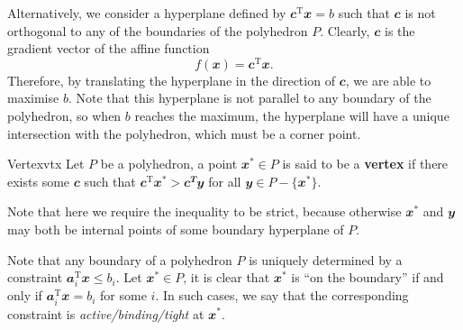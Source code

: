 \documentclass[math, code]{amznotes}
\theoremstyle{remark}
\begin{document}
Alternatively, we consider a hyperplane defined by $\mathbfit{c}^{\mathrm{T}}\mathbfit{x} = b$ such that $\mathbfit{c}$ is not orthogonal to any of the boundaries of the polyhedron $P$. Clearly, $\mathbfit{c}$ is the gradient vector of the affine function
\begin{equation*}
    f(\mathbfit{x}) = \mathbfit{c}^{\mathrm{T}}\mathbfit{x}.
\end{equation*}
Therefore, by translating the hyperplane in the direction of $\mathbfit{c}$, we are able to maximise $b$. Note that this hyperplane is not parallel to any boundary of the polyhedron, so when $b$ reaches the maximum, the hyperplane will have a unique intersection with the polyhedron, which must be a corner point.
\begin{dfnbox}{Vertex}{vtx}
    Let $P$ be a polyhedron, a point $\mathbfit{x}^* \in P$ is said to be a {\color{red} \textbf{vertex}} if there exists some $\mathbfit{c}$ such that $\mathbfit{c}^{\mathrm{T}}\mathbfit{x}^* > \mathbfit{c}^{\mathbfit{T}}\mathbfit{y}$ for all $\mathbfit{y} \in P - \{\mathbfit{x}^*\}$.
\end{dfnbox}
Note that here we require the inequality to be strict, because otherwise $\mathbfit{x}^*$ and $\mathbfit{y}$ may both be internal points of some boundary hyperplane of $P$.

Note that any boundary of a polyhedron $P$ is uniquely determined by a constraint $\mathbfit{a}_i^{\mathrm{T}}\mathbfit{x} \leq b_i$. Let $\mathbfit{x}^* \in P$, it is clear that $\mathbfit{x}^*$ is ``on the boundary'' if and only if $\mathbfit{a}_i^{\mathrm{T}}\mathbfit{x} = b_i$ for some $i$. In such cases, we say that the corresponding constraint is \textit{active/binding/tight} at $\mathbfit{x}^*$.
\end{document}
